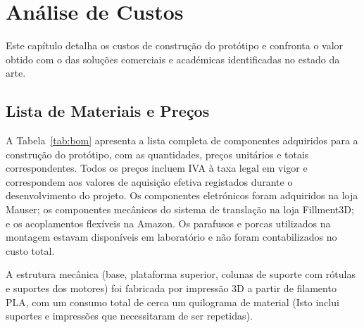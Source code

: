 

\chapter{Análise de Custos}
\label{chapter:costs}

\begin{introduction}
Este capítulo detalha os custos de construção do protótipo e confronta o valor obtido com o das soluções comerciais e académicas identificadas no estado da arte.
\end{introduction}

\section{Lista de Materiais e Preços}
\label{sec:lista-materiais}

A Tabela~\ref{tab:bom} apresenta a lista completa de componentes adquiridos para a construção do protótipo, com as quantidades, preços unitários e totais correspondentes. Todos os preços incluem IVA à taxa legal em vigor e correspondem aos valores de aquisição efetiva registados durante o desenvolvimento do projeto. Os componentes eletrónicos foram adquiridos na loja Mauser; os componentes mecânicos do sistema de translação na loja Fillment3D; e os acoplamentos flexíveis na Amazon. Os parafusos e porcas utilizados na montagem estavam disponíveis em laboratório e não foram contabilizados no custo total.

A estrutura mecânica (base, plataforma superior, colunas de suporte com rótulas e suportes dos motores) foi fabricada por impressão 3D a partir de filamento PLA, com um consumo total de cerca um quilograma de material (Isto inclui suportes e impressões que necessitaram de ser repetidas).

